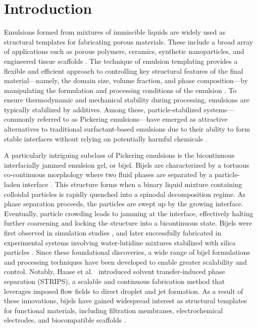 \section{Introduction}

Emulsions formed from mixtures of immiscible liquids are widely used as structural 
templates for fabricating porous materials. These include a broad array of applications 
such as porous polymers, ceramics, synthetic nanoparticles, and engineered tissue scaffolds 
\cite{zhang_emulsion_2019, stubenrauch_emulsion_2018, jones_high-temperature_2009, binks_macroporous_2002, aldemir_dikici_basic_2020}. 
The technique of emulsion templating 
provides a flexible and efficient approach to controlling key structural features of the final
material—namely, the domain size, volume fraction, and phase composition—by manipulating the 
formulation and processing conditions of the emulsion \cite{mudassir_fundamentals_2021}. To ensure 
thermodynamic and mechanical stability during processing, emulsions are typically stabilized by additives. 
Among these, particle-stabilized systems—commonly referred to as Pickering emulsions—have emerged as attractive 
alternatives to traditional surfactant-based emulsions due to their ability to form stable interfaces without 
relying on potentially harmful chemicals \cite{ramsden_separation_1904, zheng_pickering_2022, menner_particle-stabilized_2007}.

A particularly intriguing subclass of Pickering emulsions is the bicontinuous interfacially jammed emulsion gel, or bijel. 
Bijels are characterized by a tortuous co-continuous morphology where two fluid phases are separated by a particle-laden 
interface \cite{cates_bijels_2008}. This structure forms when a binary liquid mixture containing colloidal particles is 
rapidly quenched into a spinodal decomposition regime. As phase separation proceeds, the particles are swept up by the 
growing interface. Eventually, particle crowding leads to jamming at the interface, effectively halting further coarsening 
and locking the structure into a bicontinuous state. Bijels were first observed in simulation studies \cite{stratford_colloidal_2005}, 
and later successfully fabricated in experimental systems involving water-lutidine mixtures stabilized with silica particles 
\cite{clegg_emulsification_2007, herzig_bicontinuous_2007}. Since these foundational discoveries, a wide range of bijel 
formulations and processing techniques have been developed to enable greater scalability and control. Notably, 
Haase et al.~\cite{haase_continuous_2015} introduced solvent transfer-induced phase separation (STRIPS), a scalable 
and continuous fabrication method that leverages imposed flow fields to direct droplet and jet formation. As a result 
of these innovations, bijels have gained widespread interest as structural templates for functional materials, including 
filtration membranes, electrochemical electrodes, and biocompatible scaffolds 
\cite{yabuno_preparation_2020, pang_highly_2020, witt_microstructural_2016, thorson_composite_2018}.

